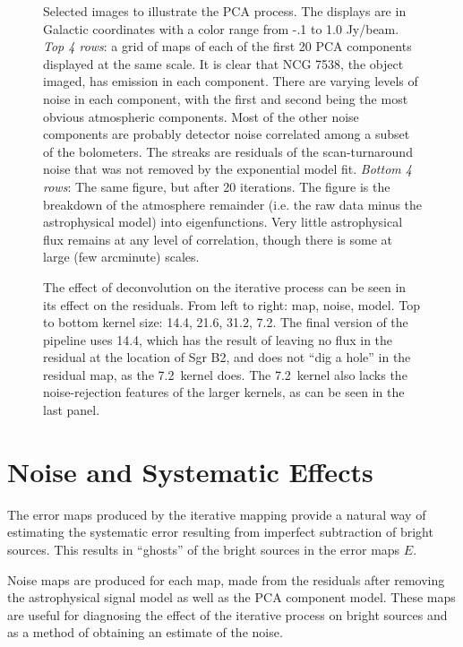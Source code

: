 \documentclass[12pt,preprint]{aastex}
\def\Figure#1#2#3#4{
\begin{figure}[htb]
\epsscale{#4}
\plotone{#1}
\caption{#2}
\label{#3}
\end{figure}
}
\begin{document}
\begin{figure}
  \caption{Selected images to illustrate the PCA process.  The displays are in
  Galactic coordinates with a color range from -.1 to 1.0 Jy/beam.
  {\it Top 4 rows}: a grid of maps of each of the first 20 PCA components displayed at
  the same scale.  It is clear that NCG 7538, the object imaged, has emission
  in each component.  There are varying levels of noise in each component, with
  the first and second being the most obvious atmospheric components.  Most of
  the other noise components are probably detector noise correlated among a
  subset of the bolometers.  The streaks are residuals of the scan-turnaround
  noise that was not removed by the exponential model fit.  {\it Bottom 4
  rows}: The same figure, but after 20 iterations.  The figure is the breakdown
  of the atmosphere remainder (i.e.  the raw data minus the astrophysical
  model) into eigenfunctions.  Very little astrophysical flux remains at any
  level of correlation, though there is some at large (few arcminute) scales.}
\label{fig:PCA_Graphical}

\end{figure}

\Figure{l001_deconvolutionkernelcompare}{The effect of deconvolution
on the iterative process can be seen in its effect on the
residuals. From left to right: map, noise, model. Top to
bottom kernel size: 14.4\arcsec, 21.6\arcsec, 31.2\arcsec,
7.2\arcsec. The final version of the pipeline uses 14.4\arcsec, which
has the result of leaving no flux in the residual at the location of
Sgr B2, and does not ``dig a hole'' in the residual map, as the
7.2\arcsec\ kernel does.  The 7.2\arcsec\ kernel also lacks the
noise-rejection features of the larger kernels, as can be seen in the
last panel.}{fig:Deconvolution}{1.0}

\clearpage

\section{Noise and Systematic Effects}
\label{sec:Noise}

The error maps produced by the iterative mapping provide a natural way
of estimating the systematic error resulting from imperfect
subtraction of bright sources.  This results in ``ghosts'' of the
bright sources in the error maps $E$.  

Noise maps are produced for each map, made from the residuals after
removing the astrophysical signal model as well as the PCA component
model.  These maps are useful for diagnosing the effect of the
iterative process on bright sources and as a method of obtaining an
estimate of the noise.
\end{document}
